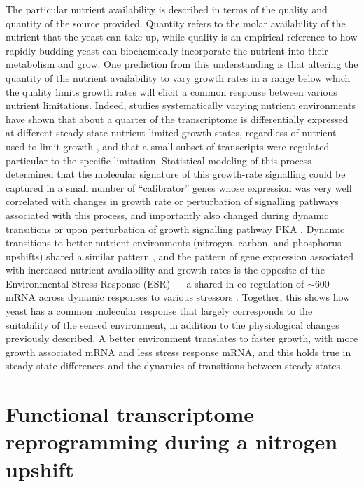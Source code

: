 The particular nutrient availability is described in terms of the 
quality and quantity of the source provided. Quantity refers to
the molar availability of the nutrient that the yeast can take up,
while quality is an empirical reference to how rapidly budding
yeast can biochemically incorporate the nutrient into their metabolism
and grow.
One prediction from this understanding is that
altering the quantity of the nutrient availability to vary growth
rates in a range below which the quality limits growth rates will
elicit a common response between various nutrient limitations.
Indeed, studies systematically varying nutrient environments have
shown that about a quarter of the transcriptome is differentially
expressed at different steady-state nutrient-limited growth states,
regardless of nutrient used to limit growth 
\parencite{brauer2008coordination,regenberg2006growth}, and that a
small subset of transcripts were regulated particular to the specific
limitation. 
Statistical modeling of this process
determined that the molecular signature of this growth-rate signalling
could be captured in a small number of “calibrator” genes whose
expression was very well correlated with changes in growth rate or
perturbation of signalling pathways associated with this process, and
importantly also changed during dynamic transitions or upon
perturbation of growth signalling pathway PKA 
\parencite{airoldi2009predicting}.
Dynamic transitions to better nutrient environments (nitrogen, carbon,
and phosphorus upshifts) shared a similar pattern 
\parencite{conway2012glucose}, 
and the pattern of gene expression associated with increased
nutrient availability and growth rates is the opposite of the
Environmental Stress Response (ESR) --- a shared in co-regulation of
$\sim$600 mRNA across dynamic responses to various stressors 
\parencite{gasch2000genomic}. 
Together, this shows how yeast has a common molecular response that
largely corresponds to the suitability of the sensed environment,
in addition to the physiological changes previously described.
A better environment translates to faster growth, with
more growth associated mRNA and less stress response mRNA, and this
holds true in steady-state differences and the dynamics of 
transitions between steady-states.

\section{Functional transcriptome reprogramming during a
nitrogen upshift}

